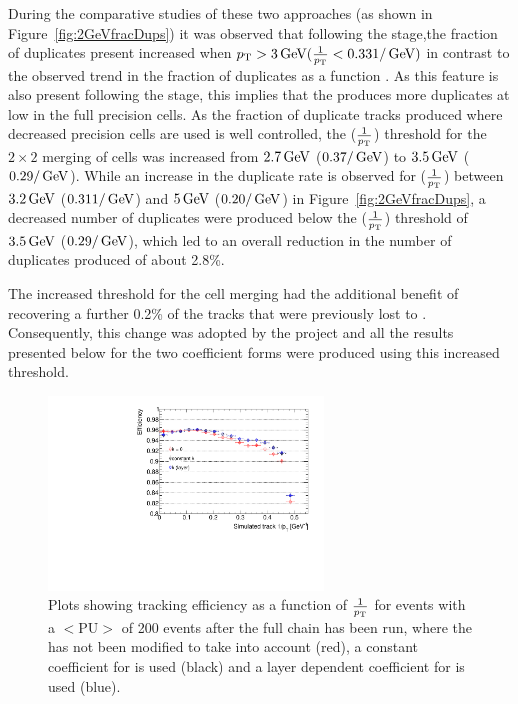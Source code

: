 During the comparative studies of these two approaches (as shown in Figure~\ref{fig:2GeVfracDups}) it was observed that following the \DR stage,the fraction of duplicates present increased when $p_{\mathrm{T}} > 3\,\text{Ge\hspace{-.08em}V} (\frac{1}{p_{\mathrm{T}}} < 0.33 1/\,\text{Ge\hspace{-.08em}V})$ in contrast to the observed trend in the fraction of duplicates as a function \pT.
As this feature is also present following the \HT stage, this implies that the \HT produces more duplicates at low \pT in the full precision cells.
As the fraction of duplicate tracks produced where decreased precision \HT cells are used is well controlled, the \pT ($\frac{1}{p_{\mathrm{T}}}$) threshold for the $2 \times 2$ merging of \HT cells was increased from $2.7\,\text{Ge\hspace{-.08em}V}$ ($0.37/\,\text{Ge\hspace{-.08em}V}$) to $3.5\,\text{Ge\hspace{-.08em}V}$ ($0.29/\,\text{Ge\hspace{-.08em}V}$).
While an increase in the duplicate rate is observed for \pT ($\frac{1}{p_{\mathrm{T}}}$) between $3.2\,\text{Ge\hspace{-.08em}V}$ ($0.31 1/\,\text{Ge\hspace{-.08em}V}$) and $5\,\text{Ge\hspace{-.08em}V}$ ($0.20/\,\text{Ge\hspace{-.08em}V}$) in Figure~\ref{fig:2GeVfracDups}, a decreased number of duplicates were produced below the \pt ($\frac{1}{p_{\mathrm{T}}}$) threshold of $3.5\,\text{Ge\hspace{-.08em}V}$ ($0.29/\,\text{Ge\hspace{-.08em}V}$), which led to an overall reduction in the number of duplicates produced of about 2.8\%.

The increased \pT threshold for the \HT cell merging had the additional benefit of recovering a further 0.2\% of the tracks that were previously lost to \MS.
Consequently, this change was adopted by the project and all the results presented below for the two \MS coefficient forms were produced using this increased threshold. 

\begin{figure}[htb]
\centering
\includegraphics[width=0.65\textwidth]{figs/tk-upgrade/results-lowPtTracking/kfTrackingEffVsInvPtTiltedGeometry_5000.pdf}
\caption{Plots showing tracking efficiency as a function of $\frac{1}{p_{\mathrm{T}}}$ for \ttbar events with a $<\textrm{PU}>$ of 200 events after the full chain has been run, where the \KF has not been modified to take \MS into account (red), a constant coefficient for \MS is used (black) and a layer dependent coefficient for \MS is used (blue).
}
\label{fig:2GeVTiltEff}	
\end{figure}

